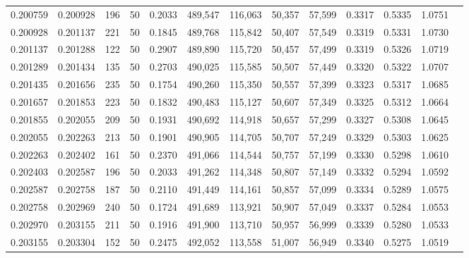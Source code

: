 \begin{tabular}{rrrrrrrrrrrrr}
0.200759 & 0.200928 &   196 &  50 &                                     0.2033 & 489,547 & 116,063 &  50,357 &  57,599 & 0.3317 & 0.5335 & 1.0751 \\
0.200928 & 0.201137 &   221 &  50 &                                     0.1845 & 489,768 & 115,842 &  50,407 &  57,549 & 0.3319 & 0.5331 & 1.0730 \\
0.201137 & 0.201288 &   122 &  50 &                                     0.2907 & 489,890 & 115,720 &  50,457 &  57,499 & 0.3319 & 0.5326 & 1.0719 \\
0.201289 & 0.201434 &   135 &  50 &                                     0.2703 & 490,025 & 115,585 &  50,507 &  57,449 & 0.3320 & 0.5322 & 1.0707 \\
0.201435 & 0.201656 &   235 &  50 &                                     0.1754 & 490,260 & 115,350 &  50,557 &  57,399 & 0.3323 & 0.5317 & 1.0685 \\
0.201657 & 0.201853 &   223 &  50 &                                     0.1832 & 490,483 & 115,127 &  50,607 &  57,349 & 0.3325 & 0.5312 & 1.0664 \\
0.201855 & 0.202055 &   209 &  50 &                                     0.1931 & 490,692 & 114,918 &  50,657 &  57,299 & 0.3327 & 0.5308 & 1.0645 \\
0.202055 & 0.202263 &   213 &  50 &                                     0.1901 & 490,905 & 114,705 &  50,707 &  57,249 & 0.3329 & 0.5303 & 1.0625 \\
0.202263 & 0.202402 &   161 &  50 &                                     0.2370 & 491,066 & 114,544 &  50,757 &  57,199 & 0.3330 & 0.5298 & 1.0610 \\
0.202403 & 0.202587 &   196 &  50 &                                     0.2033 & 491,262 & 114,348 &  50,807 &  57,149 & 0.3332 & 0.5294 & 1.0592 \\
0.202587 & 0.202758 &   187 &  50 &                                     0.2110 & 491,449 & 114,161 &  50,857 &  57,099 & 0.3334 & 0.5289 & 1.0575 \\
0.202758 & 0.202969 &   240 &  50 &                                     0.1724 & 491,689 & 113,921 &  50,907 &  57,049 & 0.3337 & 0.5284 & 1.0553 \\
0.202970 & 0.203155 &   211 &  50 &                                     0.1916 & 491,900 & 113,710 &  50,957 &  56,999 & 0.3339 & 0.5280 & 1.0533 \\
0.203155 & 0.203304 &   152 &  50 &                                     0.2475 & 492,052 & 113,558 &  51,007 &  56,949 & 0.3340 & 0.5275 & 1.0519 \\

\end{tabular}
